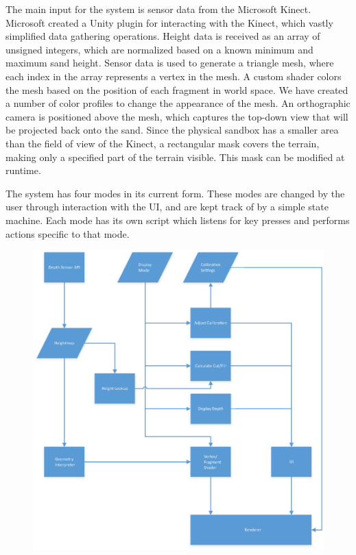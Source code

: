 \documentclass[onecolumn, draftclsnofoot,10pt, compsoc]{IEEEtran}
\begin{document}
The main input for the system is sensor data from the Microsoft Kinect. Microsoft created a Unity plugin for interacting with the Kinect, which vastly simplified data gathering operations. Height data is received as an array of unsigned integers, which are normalized based on a known minimum and maximum sand height. Sensor data is used to generate a triangle mesh, where each index in the array represents a vertex in the mesh. A custom shader colors the mesh based on the position of each fragment in world space. We have created a number of color profiles to change the appearance of the mesh. An orthographic camera is positioned above the mesh, which captures the top-down view that will be projected back onto the sand. Since the physical sandbox has a smaller area than the field of view of the Kinect, a rectangular mask covers the terrain, making only a specified part of the terrain visible. This mask can be modified at runtime. 

The system has four modes in its current form. These modes are changed by the user through interaction with the UI, and are kept track of by a simple state machine. Each mode has its own script which listens for key presses and performs actions specific to that mode. 

\begin{figure}[H]
	\centering
	\includegraphics[width=6in]{SysArch}
    \label{fig:sysarchitecture}
\end{figure}
\end{document}
